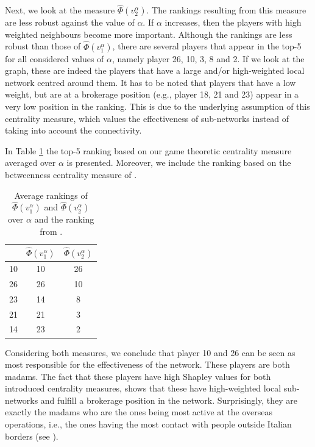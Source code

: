 \documentclass[10p]{article}
\theoremstyle{definition}
\theoremstyle{definition}
\begin{document}
Next, we look at the measure $\hat{\Phi}(v_2^\alpha)$. The rankings resulting from this measure are less robust against the value of $\alpha$. If $\alpha$ increases, then the players with high weighted neighbours become more important. Although the rankings are less robust than those of $\hat{\Phi}(v_1^\alpha)$, there are several players that appear in the top-5 for all considered values of $\alpha$, namely player 26, 10, 3, 8 and 2. If we look at the graph, these are indeed the players that have a large and/or high-weighted local network centred around them. It has to be noted that players that have a low weight, but are at a brokerage position (e.g., player 18, 21 and 23) appear in a very low position in the ranking. This is due to the underlying assumption of this centrality measure, which values the effectiveness of sub-networks instead of taking into account the connectivity. 

In Table \ref{TableAverageRankings} the top-5 ranking based on our game theoretic centrality measure averaged over $\alpha$ is presented. Moreover, we include the ranking based on the betweenness centrality measure of \cite{mancuso2014not}.
\begin{table}[H]\centering
\begin{tabular}{*{3}{c}}
\toprule
\cite{mancuso2014not}
 & $\hat{\Phi}(v_1^\alpha)$ & $\hat{\Phi}(v_2^\alpha)$ \\
\midrule
10 & 10 & 26 \\ 
26 & 26 & 10\\ 
23 &14 & 8 \\ 
21 & 21& 3 \\ 
14 & 23& 2 \\ 
\bottomrule
\end{tabular}
\caption{Average rankings of $\hat{\Phi}(v_1^\alpha)$ and $\hat{\Phi}(v_2^\alpha)$ over $\alpha$ and the ranking from \cite{mancuso2014not}. \label{TableAverageRankings}}
\end{table}

\noindent Considering both measures, we conclude that player 10 and 26 can be seen as most responsible for the effectiveness of the network. These players are both madams. The fact that these players have high Shapley values for both introduced centrality measures, shows that these have high-weighted local sub-networks and fulfill a brokerage position in the network. Surprisingly, they are exactly the madams who are the ones being most active at the overseas operations, i.e., the ones having the most contact with people outside Italian borders (see \cite{mancuso2014not}). 
\end{document}
